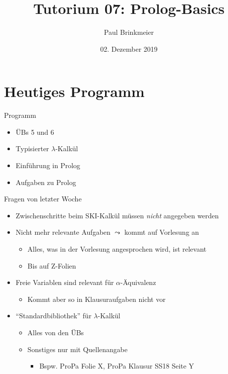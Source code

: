 \documentclass{beamer}
\title{Tutorium 07: Prolog-Basics}
\author{Paul Brinkmeier}
\institute{Tutorium Programmierparadigmen am KIT}
\date{02. Dezember 2019}
\begin{document}
\begin{frame}
	\titlepage
\end{frame}

\section{Heutiges Programm}

\begin{frame}{Programm}
	\begin{itemize}
		\item ÜBs 5 und 6
		\item Typisierter $\lambda$-Kalkül
		\item Einführung in Prolog
		\item Aufgaben zu Prolog
	\end{itemize}
\end{frame}

\begin{frame}{Fragen von letzter Woche}
	\begin{itemize}
		\item Zwischenschritte beim SKI-Kalkül müssen \emph{nicht} angegeben werden
		\pause
		\item Nicht mehr relevante Aufgaben $\leadsto$ kommt auf Vorlesung an
		\begin{itemize}
			\item Alles, was in der Vorlesung angesprochen wird, ist relevant
			\pause
			\item Bis auf Z-Folien
		\end{itemize}
		\pause
		\item Freie Variablen sind relevant für $\alpha$-Äquivalenz
		\begin{itemize}
			\item Kommt aber so in Klausuraufgaben nicht vor
		\end{itemize}
		\pause
		\item \enquote{Standardbibliothek} für $\lambda$-Kalkül
		\begin{itemize}
			\item Alles von den ÜBs
			\item Sonstiges nur mit Quellenangabe
			\begin{itemize}
				\item Bspw. ProPa Folie X, ProPa Klausur SS18 Seite Y
			\end{itemize}
		\end{itemize}
	\end{itemize}
\end{frame}
\end{document}
